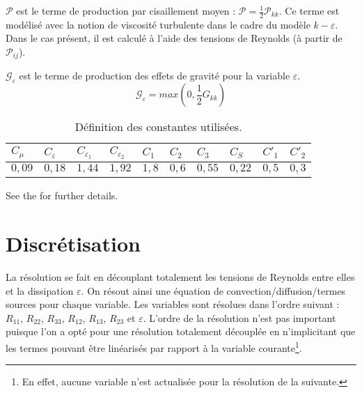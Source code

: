 $\mathcal{P}$ est le terme de production par cisaillement moyen :
$\mathcal{P} =\displaystyle \frac{1}{2} \mathcal{P}_{kk}$. Ce terme est
mod\'elis\'e avec la notion de viscosit\'e turbulente dans le cadre du mod\`ele
$k-\varepsilon$. Dans le cas pr\'esent, il est calcul\'e \`a l'aide des tensions
de Reynolds (\`a partir de $\mathcal{P}_{ij}$).

$\mathcal{G}_{\varepsilon}$ est le terme de production des effets de gravit\'e pour la variable $\varepsilon$.
\begin{equation}
\mathcal{G}_{\varepsilon} = max(0,\frac{1}{2}G_{kk})
\end{equation}
\begin{table}
{\scriptsize
\begin{center}
\begin{tabular}{|l|l|l|l|l|l|l|l|l|l|}
\hline
$C_\mu$  & $C_{\varepsilon}$  & $C_{\varepsilon_1}$ &
$C_{\varepsilon_2}$  & $C_1$ & $C_2$ & $C_3$ & $C_S$
& $C'_1$ & $C'_2$ \\
\hline
$0,09$ & $ 0,18$ & $1,44$ & $1,92$ & $1,8$ & $0,6$ & $0,55$ & $0,22$ & $0,5$ &
$0,3$ \\
\hline
\end{tabular}
\end{center}
}
\caption{D\'efinition des constantes utilis\'ees.}\label{Base_Turrij_table_Cstes}
\end{table}

See the  for further details.

\section*{Discr\'etisation}
La r\'esolution se fait en d\'ecouplant totalement les tensions de Reynolds
entre elles et la dissipation $\varepsilon$. On r\'esout ainsi une \'equation de
convection/diffusion/termes sources pour chaque variable. Les variables sont
r\'esolues dans l'ordre suivant : $R_{11}$, $R_{22}$, $R_{33}$, $R_{12}$,
$R_{13}$, $R_{23}$ et $ \varepsilon$. L'ordre de la r\'esolution n'est pas
important puisque l'on a opt\'e pour une r\'esolution totalement d\'ecoupl\'ee
en n'implicitant que les termes pouvant \^etre lin\'earis\'es par rapport \`a la
variable courante\footnote{En effet, aucune variable n'est actualis\'ee pour la r\'esolution de la suivante.}.

